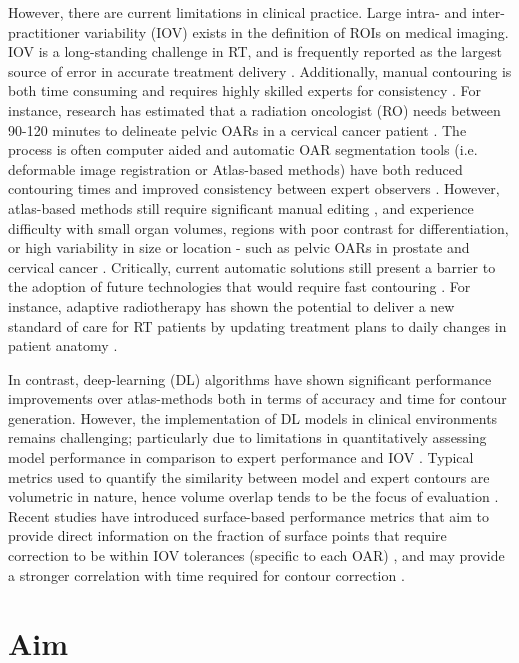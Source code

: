 However, there are current limitations in clinical practice. Large intra- and inter-practitioner variability (IOV) exists in the definition of ROIs on medical imaging. IOV is a long-standing challenge in RT, and is frequently reported as the largest source of error in accurate treatment delivery \cite{Vinod_2016}. Additionally, manual contouring is both time consuming and requires highly skilled experts for consistency \cite{Nikolov_2018}. For instance, research has estimated that a radiation oncologist (RO) needs between 90-120 minutes to delineate pelvic OARs in a cervical cancer patient \cite{Liu_2020}. The process is often computer aided and automatic OAR segmentation tools (i.e. deformable image registration or Atlas-based methods) have both reduced contouring times and improved consistency between expert observers \cite{Vinod_2016}. However, atlas-based methods still require significant manual editing \cite{Nikolov_2018}, and experience difficulty with small organ volumes, regions with poor contrast for differentiation, or high variability in size or location - such as pelvic OARs in prostate and cervical cancer \cite{Schreier_2020, Liu_2020}. Critically, current automatic solutions still present a barrier to the adoption of future technologies that would require fast contouring \cite{Nikolov_2018}. For instance, adaptive radiotherapy has shown the potential to deliver a new standard of care for RT patients by updating treatment plans to daily changes in patient anatomy \cite{Nikolov_2018}. 

In contrast, deep-learning (DL) algorithms have shown significant performance improvements over atlas-methods both in terms of accuracy and time for contour generation. However, the implementation of DL models in clinical environments remains challenging; particularly due to limitations in quantitatively assessing model performance in comparison to expert performance and IOV \cite{Nikolov_2018}. Typical metrics used to quantify the similarity between model and expert contours are volumetric in nature, hence volume overlap tends to be the focus of evaluation \cite{Nikolov_2018}. Recent studies have introduced surface-based performance metrics that aim to provide direct information on the fraction of surface points that require correction to be within IOV tolerances (specific to each OAR) \cite{Nikolov_2018, Vaassen_2020}, and may provide a stronger correlation with time required for contour correction \cite{Vaassen_2020}.

\section{Aim}

